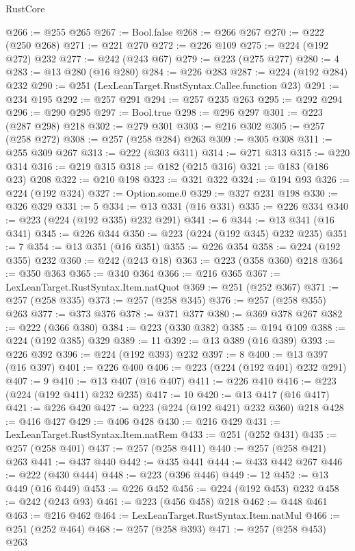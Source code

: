 \begin{lexlean}{RustCore}
\begin{coremodule}
@266 := @255 @265
@267 := Bool.false
@268 := @266 @267
@270 := @222 (@250 @268)
@271 := @221 @270
@272 := @226 @109
@275 := @224 (@192 @272) @232
@277 := @242 (@243 @67)
@279 := @223 (@275 @277)
@280 := 4
@283 := @13 @280 (@16 @280)
@284 := @226 @283
@287 := @224 (@192 @284) @232
@290 := @251 (LexLeanTarget.RustSyntax.Callee.function @23)
@291 := @234 @195
@292 := @257 @291
@294 := @257 @235 @263
@295 := @292 @294
@296 := @290 @295
@297 := Bool.true
@298 := @296 @297
@301 := @223 (@287 @298) @218
@302 := @279 @301
@303 := @216 @302
@305 := @257 (@258 @272)
@308 := @257 (@258 @284) @263
@309 := @305 @308
@311 := @255 @309 @267
@313 := @222 (@303 @311)
@314 := @271 @313
@315 := @220 @314
@316 := @219 @315
@318 := @182 (@215 @316)
@321 := @183 (@186 @23) @208
@322 := @210 @198
@323 := @321 @322
@324 := @194 @93
@326 := @224 (@192 @324)
@327 := Option.some.{0}
@329 := @327 @231 @198
@330 := @326 @329
@331 := 5
@334 := @13 @331 (@16 @331)
@335 := @226 @334
@340 := @223 (@224 (@192 @335) @232 @291)
@341 := 6
@344 := @13 @341 (@16 @341)
@345 := @226 @344
@350 := @223 (@224 (@192 @345) @232 @235)
@351 := 7
@354 := @13 @351 (@16 @351)
@355 := @226 @354
@358 := @224 (@192 @355) @232
@360 := @242 (@243 @18)
@363 := @223 (@358 @360) @218
@364 := @350 @363
@365 := @340 @364
@366 := @216 @365
@367 := LexLeanTarget.RustSyntax.Item.natQuot
@369 := @251 (@252 @367)
@371 := @257 (@258 @335)
@373 := @257 (@258 @345)
@376 := @257 (@258 @355) @263
@377 := @373 @376
@378 := @371 @377
@380 := @369 @378 @267
@382 := @222 (@366 @380)
@384 := @223 (@330 @382)
@385 := @194 @109
@388 := @224 (@192 @385) @329
@389 := 11
@392 := @13 @389 (@16 @389)
@393 := @226 @392
@396 := @224 (@192 @393) @232
@397 := 8
@400 := @13 @397 (@16 @397)
@401 := @226 @400
@406 := @223 (@224 (@192 @401) @232 @291)
@407 := 9
@410 := @13 @407 (@16 @407)
@411 := @226 @410
@416 := @223 (@224 (@192 @411) @232 @235)
@417 := 10
@420 := @13 @417 (@16 @417)
@421 := @226 @420
@427 := @223 (@224 (@192 @421) @232 @360) @218
@428 := @416 @427
@429 := @406 @428
@430 := @216 @429
@431 := LexLeanTarget.RustSyntax.Item.natRem
@433 := @251 (@252 @431)
@435 := @257 (@258 @401)
@437 := @257 (@258 @411)
@440 := @257 (@258 @421) @263
@441 := @437 @440
@442 := @435 @441
@444 := @433 @442 @267
@446 := @222 (@430 @444)
@448 := @223 (@396 @446)
@449 := 12
@452 := @13 @449 (@16 @449)
@453 := @226 @452
@456 := @224 (@192 @453) @232
@458 := @242 (@243 @93)
@461 := @223 (@456 @458) @218
@462 := @448 @461
@463 := @216 @462
@464 := LexLeanTarget.RustSyntax.Item.natMul
@466 := @251 (@252 @464)
@468 := @257 (@258 @393)
@471 := @257 (@258 @453) @263

\end{coremodule}
\end{lexlean}
